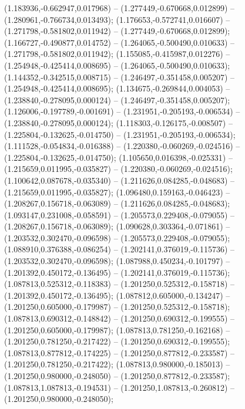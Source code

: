  (1.183936,-0.662947,0.017968) -- (1.277449,-0.670668,0.012899) -- (1.280961,-0.766734,0.013493);
 (1.176653,-0.572741,0.016607) -- (1.271798,-0.581802,0.011942) -- (1.277449,-0.670668,0.012899);
 (1.166727,-0.490877,0.014752) -- (1.264065,-0.500490,0.010633) -- (1.271798,-0.581802,0.011942);
 (1.155085,-0.415987,0.012276) -- (1.254948,-0.425414,0.008695) -- (1.264065,-0.500490,0.010633);
 (1.144352,-0.342515,0.008715) -- (1.246497,-0.351458,0.005207) -- (1.254948,-0.425414,0.008695);
 (1.134675,-0.269844,0.004053) -- (1.238840,-0.278095,0.000124) -- (1.246497,-0.351458,0.005207);
 (1.126006,-0.197789,-0.001691) -- (1.231951,-0.205193,-0.006534) -- (1.238840,-0.278095,0.000124);
 (1.118303,-0.126175,-0.008507) -- (1.225804,-0.132625,-0.014750) -- (1.231951,-0.205193,-0.006534);
 (1.111528,-0.054834,-0.016388) -- (1.220380,-0.060269,-0.024516) -- (1.225804,-0.132625,-0.014750);
 (1.105650,0.016398,-0.025331) -- (1.215659,0.011995,-0.035827) -- (1.220380,-0.060269,-0.024516);
 (1.100642,0.087678,-0.035340) -- (1.211626,0.084285,-0.048683) -- (1.215659,0.011995,-0.035827);
 (1.096480,0.159163,-0.046423) -- (1.208267,0.156718,-0.063089) -- (1.211626,0.084285,-0.048683);
 (1.093147,0.231008,-0.058591) -- (1.205573,0.229408,-0.079055) -- (1.208267,0.156718,-0.063089);
 (1.090628,0.303364,-0.071861) -- (1.203532,0.302470,-0.096598) -- (1.205573,0.229408,-0.079055);
 (1.088910,0.376388,-0.086254) -- (1.202141,0.376019,-0.115736) -- (1.203532,0.302470,-0.096598);
 (1.087988,0.450234,-0.101797) -- (1.201392,0.450172,-0.136495) -- (1.202141,0.376019,-0.115736);
 (1.087813,0.525312,-0.118383) -- (1.201250,0.525312,-0.158718) -- (1.201392,0.450172,-0.136495);
 (1.087812,0.605000,-0.134247) -- (1.201250,0.605000,-0.179987) -- (1.201250,0.525312,-0.158718);
 (1.087813,0.690312,-0.148842) -- (1.201250,0.690312,-0.199555) -- (1.201250,0.605000,-0.179987);
 (1.087813,0.781250,-0.162168) -- (1.201250,0.781250,-0.217422) -- (1.201250,0.690312,-0.199555);
 (1.087813,0.877812,-0.174225) -- (1.201250,0.877812,-0.233587) -- (1.201250,0.781250,-0.217422);
 (1.087813,0.980000,-0.185013) -- (1.201250,0.980000,-0.248050) -- (1.201250,0.877812,-0.233587);
 (1.087813,1.087813,-0.194531) -- (1.201250,1.087813,-0.260812) -- (1.201250,0.980000,-0.248050);
